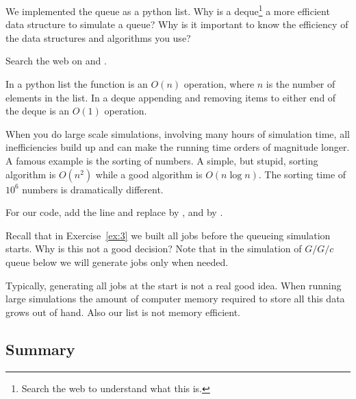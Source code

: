 \begin{exercise}

  We implemented the queue as a python list. Why is a deque\footnote{Search the web to understand what this is.} a more efficient data structure to simulate a queue?  Why is it important to know the efficiency of the data structures and algorithms you use?
  \begin{hint}
  Search the web on  and .
  \end{hint}
  \begin{solution}
    In a python list the  function is an $O(n)$ operation, where $n$ is the number of elements in the list. In a deque appending and removing items to either end of the deque is an $O(1)$ operation.

When you do large scale simulations, involving many hours of simulation time, all inefficiencies build up and can make the running time orders of magnitude longer. A famous example is the sorting of numbers. A simple, but stupid, sorting algorithm is $O(n^2)$ while a good algorithm is $O(n \log n)$. The sorting time of $10^6$ numbers is dramatically different. 

    For our code, add the line  and replace  by , and   by .
  \end{solution}
\end{exercise}

\begin{exercise}
  Recall that in Exercise~\ref{ex:3} we built all jobs before the queueing simulation starts. Why is this not a good decision? Note that in the simulation of $G/G/c$ queue below we will generate jobs only when needed. 
  \begin{solution}
    Typically, generating all jobs at the start is not a real good idea. When running large simulations the amount of computer memory required to store all this data grows out of hand. Also our  list is not memory efficient. 
  \end{solution}
\end{exercise}


\subsection{Summary }
\label{sec:summary-}


